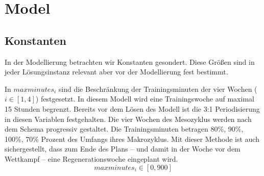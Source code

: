 \section{Model}
\label{sec:modellierung:model}


\subsection{Konstanten}
In der Modellierung betrachten wir Konstanten gesondert. Diese Größen sind in jeder Lösungsinstanz relevant aber vor der Modellierung fest bestimmt.

In $maxminutes_i$ sind die Beschränkung der Trainingsminuten der vier Wochen ($ i \in [ 1, 4]$) festgesetzt. In diesem Modell wird eine Trainingswoche auf maximal 15 Stunden begrenzt. Bereits vor dem Lösen des Modell ist die 3:1 Periodisierung in diesen Variablen festgehalten. Die vier Wochen des Mesozyklus werden nach dem Schema progressiv gestaltet. Die Trainingsminuten betragen 80\%, 90\%, 100\%, 70\% Prozent des Umfangs ihres Makrozyklus. Mit dieser Methode ist auch sichergestellt, dass zum Ende des Plans -- und damit in der Woche vor dem Wettkampf -- eine Regenerationswoche eingeplant wird.
\begin{equation}
     maxminutes_i \in [0, 900] 
\end{equation}


